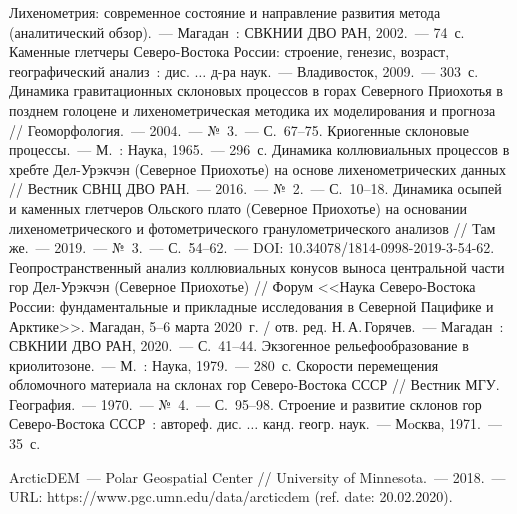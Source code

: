 \begin{thebibliography}{99}
\bibitem{} Лихенометрия: современное состояние и направление развития
метода (аналитический обзор).~--- Магадан~: СВКНИИ ДВО РАН, 2002.~--- 74~с.
\bibitem{} Каменные глетчеры Северо-Востока России: строение, генезис,
возраст, географический анализ~: дис. $\dots$ д-ра наук.~--- Владивосток, 2009.~--- 303~с.
\bibitem{} Динамика гравитационных склоновых процессов в горах Северного Приохотья в позднем голоцене и лихенометрическая методика их моделирования и прогноза // Геоморфология.~--- 2004.~--- №~3.~--- С.~67--75.
\bibitem{} Криогенные склоновые процессы.~--- М.~: Наука, 1965.~--- 296~с.
\bibitem{} Динамика коллювиальных процессов в хребте Дел-Урэкчэн (Северное Приохотье) на основе лихенометрических данных // Вестник СВНЦ ДВО РАН.~--- 2016.~--- №~2.~--- С.~10--18.
\bibitem{} Динамика осыпей и каменных глетчеров Ольского плато (Северное Приохотье) на основании лихенометрического и фотометрического гранулометрического анализов // Там же.~--- 2019.~--- №~3.~--- С.~54–62.~--- DOI: 10.34078/1814-0998-2019-3-54-62.
\bibitem{} Геопространственный анализ коллювиальных конусов выноса центральной части гор Дел-Урэкчэн (Северное Приохотье) // Форум <<Наука Северо-Востока России: фундаментальные и прикладные исследования в Северной Пацифике и Арктике>>. Магадан, 5--6 марта 2020~г. / отв. ред. Н.\,А.\,Горячев.~--- Магадан~: СВКНИИ ДВО РАН, 2020.~--- С.~41--44.
\bibitem{} Экзогенное рельефообразование в криолитозоне.~--- М.~:
Наука, 1979.~--- 280~с.
\bibitem{} Скорости перемещения обломочного материала на склонах гор
Северо-Востока СССР // Вестник МГУ. География.~--- 1970.~--- №~4.~--- С.~95--98.
\bibitem{} Строение и развитие склонов гор Северо-Востока СССР~: автореф.
дис. $\dots$ канд. геогр. наук.~--- Мoсква, 1971.~--- 35~с.

\bibitem{}ArcticDEM~--- Polar Geospatial Center // University of Minnesota.~--- 2018.~--- URL: https://www.pgc.umn.edu/\-data/arcticdem (ref. date: 20.02.2020).

\end{thebibliography}
\thispagestyle{empty}
